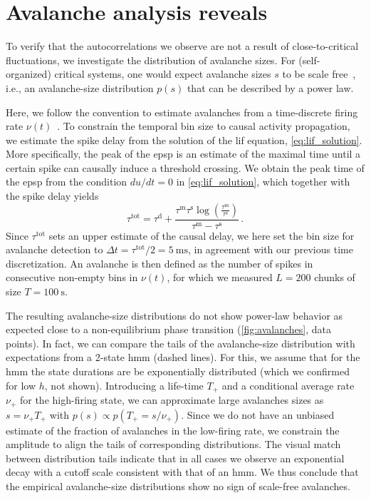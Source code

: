 \section{Avalanche analysis reveals} \label{sec:avalanches}
To verify that the autocorrelations we observe are not a result of close-to-critical fluctuations, we investigate the distribution of avalanche sizes.
For (self-organized) critical systems, one would expect avalanche sizes $s$ to be scale free~\cite{bak_self-organized_1988, pruessner_self-organised_2012}, i.e., an avalanche-size distribution $p(s)$ that can be described by a power law.

Here, we follow the convention to estimate avalanches from a time-discrete firing rate $\nu(t)$~\cite{beggs_neuronal_2003, zeraati_self-organization_2021}.
To constrain the temporal bin size to causal activity propagation, we estimate the spike delay from the solution of the \gls{lif} equation, \cref{eq:lif_solution}.
More specifically, the peak of the \gls{epsp} is an estimate of the maximal time until a certain spike can causally induce a threshold crossing.
We obtain the peak time of the \gls{epsp} from the condition $du / dt = 0$ in \cref{eq:lif_solution}, which together with the spike delay yields
\begin{equation}
	\tau^\mathrm{tot} = \tau^\mathrm{d} + \frac{\tau^\mathrm{m}\tau^\mathrm{s} \log{\left(\frac{\tau^\mathrm{m}}{\tau^\mathrm{s}}\right)}}{\tau^\mathrm{m} - \tau^\mathrm{s}} \, .
\end{equation}
Since $\tau^\mathrm{tot}$ sets an upper estimate of the causal delay, we here set the bin size for avalanche detection to $\Delta t = \tau^\mathrm{tot} / 2 = \SI{5}{\milli\second}$, in agreement with our previous time discretization.
An avalanche is then defined as the number of spikes in consecutive non-empty bins in $\nu(t)$, for which we measured $L=\num{200}$ chunks of size $T=\SI{100}{\second}$.

The resulting avalanche-size distributions do not show power-law behavior as expected close to a non-equilibrium phase transition (\cref{fig:avalanches}, data points).
In fact, we can compare the tails of the avalanche-size distribution with expectations from a 2-state \gls{hmm} (dashed lines).
For this, we assume that for the \gls{hmm} the state durations are be exponentially distributed (which we confirmed for low $h$, not shown).
Introducing a life-time $T_+$ and a conditional average rate $\nu_{+}$ for the high-firing state, we can approximate large avalanches sizes as $s=\nu_{+}T_+$ with $p(s) \propto p(T_+=s/\nu_+)$.
Since we do not have an unbiased estimate of the fraction of avalanches in the low-firing rate, we constrain the amplitude to align the tails of corresponding distributions.
The visual match between distribution tails indicate that in all cases we observe an exponential decay with a cutoff scale consistent with that of an \gls{hmm}.
We thus conclude that the empirical avalanche-size distributions show no sign of scale-free avalanches.

